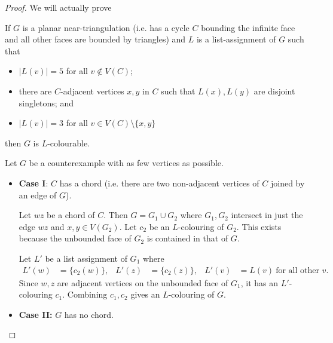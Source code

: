 \documentclass[main.tex]{subfiles}
\begin{document}
\begin{proof}
  We will actually prove
  \begin{claim}
    If $G$ is a planar near-triangulation
    (i.e. has a cycle $C$ bounding the infinite face and all other faces are
    bounded by triangles) and $L$ is a list-assignment of $G$ such that
    \begin{itemize}
      \item $|L(v)| = 5$ for all $v\notin V(C)$;
      \item there are $C$-adjacent vertices $x,y$ in $C$ such that $L(x), L(y)$
        are disjoint singletons; and
      \item $|L(v)| = 3$ for all $v\in V(C)\setminus\{x,y\}$
    \end{itemize}
    then $G$ is $L$-colourable.
  \end{claim}
  \begin{subproof}
    Let $G$ be a counterexample with as few vertices as possible.
    \begin{itemize}
      \item \textbf{Case I}: $C$ has a chord (i.e. there are two non-adjacent
        vertices of $C$ joined by an edge of $G$).

        Let $wz$ be a chord of $C$.
        Then $G = G_1\cup G_2$ where $G_1,G_2$ intersect in just the edge $wz$
        and $x,y\in V(G_2)$.
        Let $c_2$ be an $L$-colouring of $G_2$.
        This exists because the unbounded face of $G_2$ is contained in that of
        $G$.

        Let $L'$ be a list assignment of $G_1$ where
        \begin{align*}
          L'(w) &= \{c_2(w)\}, &
          L'(z) &= \{c_2(z)\}, &
          L'(v) &= L(v)\ \text{for all other $v$.}
        \end{align*}
        Since $w, z$ are adjacent vertices on the unbounded face of $G_1$,
        it has an $L'$-colouring $c_1$.
        Combining $c_1, c_2$ gives an $L$-colouring of $G$.

      \item \textbf{Case II:} $G$ has no chord.


\end{itemize}
\end{subproof}
\end{proof}
\end{document}
